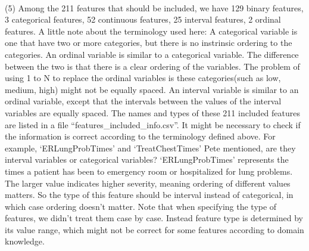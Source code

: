 \documentclass[11pt]{article}
\begin{document}
\\
(5) Among the 211 features that should be included, we have 129 binary features, 3 categorical features, 52 continuous features, 25 interval features, 2 ordinal features. A little note about the terminology used here: A categorical variable is one that have two or more categories, but there is no instrinsic ordering to the categories. An ordinal variable is similar to a categorical variable. The difference between the two is that there is a clear ordering of the variables. The problem of using 1 to N to replace the ordinal variables is these categories(such as low, medium, high) might not be equally spaced. An interval variable is similar to an ordinal variable, except that the intervals between the values of the interval variables are equally spaced. The names and types of these 211 included features are listed in a file ``features\_included\_info.csv''. It might be necessary to check if the information is correct according to the terminology defined above. For example, `ERLungProbTimes' and `TreatChestTimes' Pete mentioned, are they interval variables or categorical variables? `ERLungProbTimes' represents the times a patient has been to emergency room or hospitalized for lung problems. The larger value indicates higher severity, meaning ordering of different values matters. So the type of this feature should be interval instead of categorical, in which case ordering doesn't matter. Note that when specifying the type of features, we didn't treat them case by case. Instead feature type is determined by its value range, which might not be correct for some features according to domain knowledge.\\
\\

\end{document}
